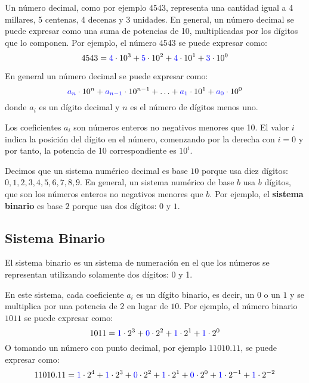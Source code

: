 Un número decimal, como por ejemplo $4543$, representa una cantidad igual a 4 millares, 5 centenas, 4 decenas y 3 unidades. En general, un número decimal se puede expresar como una suma de potencias de 10, multiplicadas por los dígitos que lo componen. Por ejemplo, el número 4543 se puede expresar como:
\begin{equation*}
    4543 = \textcolor{blue}{4} \cdot 10^3 + \textcolor{blue}{5} \cdot 10^2 + \textcolor{blue}{4} \cdot 10^1 + \textcolor{blue}{3} \cdot 10^0
\end{equation*}

\begin{mdframed}[backgroundcolor=gray!10,linewidth=0]
    En general un número decimal se puede expresar como:
    \begin{equation*}
        \textcolor{blue}{a_n} \cdot 10^n + \textcolor{blue}{a_{n-1}} \cdot 10^{n-1} + \ldots + \textcolor{blue}{a_1} \cdot 10^1 + \textcolor{blue}{a_0} \cdot 10^0
    \end{equation*}
    donde $a_i$ es un dígito decimal y $n$ es el número de dígitos menos uno.

    Los coeficientes $a_i$ son números enteros no negativos menores que 10. El valor $i$ indica la posición del dígito en el número, comenzando por la derecha con $i = 0$ y por tanto, la potencia de 10 correspondiente es $10^i$.
\end{mdframed}

Decimos que un sistema numérico decimal es base $10$ porque usa diez dígitos: $0, 1, 2, 3, 4, 5, 6, 7, 8, 9$. En general, un sistema numérico de base $b$ usa $b$ dígitos, que son los números enteros no negativos menores que $b$. Por ejemplo, el \textbf{sistema binario} es base $2$ porque usa dos dígitos: $0$ y $1$.

\subsection{Sistema Binario}
El sistema binario es un sistema de numeración en el que los números se representan utilizando solamente dos dígitos: 0 y 1.

En este sistema, cada coeficiente $a_i$ es un dígito binario, es decir, un $0$ o un $1$ y se multiplica por una potencia de $2$ en lugar de $10$. Por ejemplo, el número binario $1011$ se puede expresar como:
\begin{equation*}
    1011 = \textcolor{blue}{1} \cdot 2^3 + \textcolor{blue}{0} \cdot 2^2 + \textcolor{blue}{1} \cdot 2^1 + \textcolor{blue}{1} \cdot 2^0
\end{equation*}
O tomando un número con punto decimal, por ejemplo $11010.11$, se puede expresar como:
\begin{equation*}
    11010.11 = \textcolor{blue}{1} \cdot 2^4 + \textcolor{blue}{1} \cdot 2^3 + \textcolor{blue}{0} \cdot 2^2 + \textcolor{blue}{1} \cdot 2^1 + \textcolor{blue}{0} \cdot 2^0 + \textcolor{blue}{1} \cdot 2^{-1} + \textcolor{blue}{1} \cdot 2^{-2}
\end{equation*}

